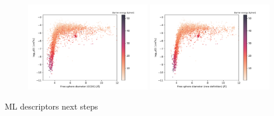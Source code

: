 \documentclass[main]{subfiles}
\begin{document}
\begin{figure}[ht]
  \centering
    \includegraphics[width=0.48\textwidth]{figures/5-diffusion/difflog_Df-ccdc_barrier.pdf}
    \includegraphics[width=0.48\textwidth]{figures/5-diffusion/difflog_Df-uff298K_barrier.pdf}
    \caption{}
    \label{fgr:}
\end{figure}

ML descriptors
next steps

\OnlyInSubfile{\printglobalbibliography}
\end{document}
